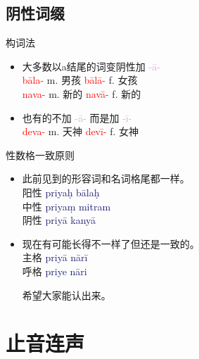 \documentclass[17pt]{beamer}
\newcommand{\nounstem}[1]{\textcolor{red}{#1\nobreakdash-}}
\newcommand{\pratyaya}[1]{\textcolor{Plum}{#1}}
\newcommand{\fullsentence}[1]{\textcolor{MidnightBlue}{#1}}
\begin{document}
\subsection{阴性词缀}
\begin{frame}{构词法~~\insertsubsection}
  \small
  \begin{itemize}
    \item 大多数以a结尾的词变阴性加 \pratyaya{\nobreakdash-ā\nobreakdash-}\\
    \nounstem{bāla} m. 男孩 \nounstem{bālā} f. 女孩 \\
    \nounstem{nava} m. 新的 \nounstem{navā} f. 新的 \\    
    \item 也有的不加 \pratyaya{\nobreakdash-ā\nobreakdash-} 而是加 \pratyaya{\nobreakdash-ī\nobreakdash-}\\
    \nounstem{deva} m. 天神 \nounstem{devī} f. 女神 \\
  \end{itemize}
\end{frame}

\begin{frame}{性数格一致原则}
  \small
  \begin{itemize}
    \item 此前见到的形容词和名词格尾都一样。\\
    
    阳性 \fullsentence{priyaḥ bālaḥ}\\
    中性 \fullsentence{priyaṃ mitram} \\
    阴性 \fullsentence{priyā kanyā}
    
    \item 现在有可能长得不一样了但还是一致的。\\
    
    主格 \fullsentence{priyā nārī}\\
    呼格 \fullsentence{priye nāri}\\
    \bigskip
    
    希望大家能认出来。
  \end{itemize}
\end{frame}


\section{止音连声}
\begin{frame}{\insertsection}
  \footnotesize
  \tableofcontents[currentsection]
\end{frame}
\end{document}
